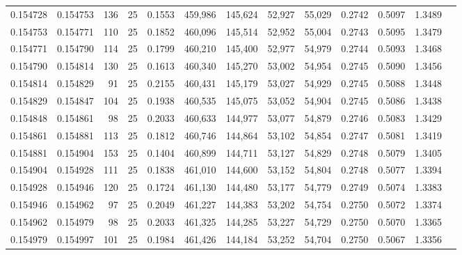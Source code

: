 \begin{tabular}{rrrrrrrrrrrrr}
0.154728 & 0.154753 &   136 &  25 &                                     0.1553 & 459,986 & 145,624 &  52,927 &  55,029 & 0.2742 & 0.5097 & 1.3489 \\
0.154753 & 0.154771 &   110 &  25 &                                     0.1852 & 460,096 & 145,514 &  52,952 &  55,004 & 0.2743 & 0.5095 & 1.3479 \\
0.154771 & 0.154790 &   114 &  25 &                                     0.1799 & 460,210 & 145,400 &  52,977 &  54,979 & 0.2744 & 0.5093 & 1.3468 \\
0.154790 & 0.154814 &   130 &  25 &                                     0.1613 & 460,340 & 145,270 &  53,002 &  54,954 & 0.2745 & 0.5090 & 1.3456 \\
0.154814 & 0.154829 &    91 &  25 &                                     0.2155 & 460,431 & 145,179 &  53,027 &  54,929 & 0.2745 & 0.5088 & 1.3448 \\
0.154829 & 0.154847 &   104 &  25 &                                     0.1938 & 460,535 & 145,075 &  53,052 &  54,904 & 0.2745 & 0.5086 & 1.3438 \\
0.154848 & 0.154861 &    98 &  25 &                                     0.2033 & 460,633 & 144,977 &  53,077 &  54,879 & 0.2746 & 0.5083 & 1.3429 \\
0.154861 & 0.154881 &   113 &  25 &                                     0.1812 & 460,746 & 144,864 &  53,102 &  54,854 & 0.2747 & 0.5081 & 1.3419 \\
0.154881 & 0.154904 &   153 &  25 &                                     0.1404 & 460,899 & 144,711 &  53,127 &  54,829 & 0.2748 & 0.5079 & 1.3405 \\
0.154904 & 0.154928 &   111 &  25 &                                     0.1838 & 461,010 & 144,600 &  53,152 &  54,804 & 0.2748 & 0.5077 & 1.3394 \\
0.154928 & 0.154946 &   120 &  25 &                                     0.1724 & 461,130 & 144,480 &  53,177 &  54,779 & 0.2749 & 0.5074 & 1.3383 \\
0.154946 & 0.154962 &    97 &  25 &                                     0.2049 & 461,227 & 144,383 &  53,202 &  54,754 & 0.2750 & 0.5072 & 1.3374 \\
0.154962 & 0.154979 &    98 &  25 &                                     0.2033 & 461,325 & 144,285 &  53,227 &  54,729 & 0.2750 & 0.5070 & 1.3365 \\
0.154979 & 0.154997 &   101 &  25 &                                     0.1984 & 461,426 & 144,184 &  53,252 &  54,704 & 0.2750 & 0.5067 & 1.3356 \\

\end{tabular}
